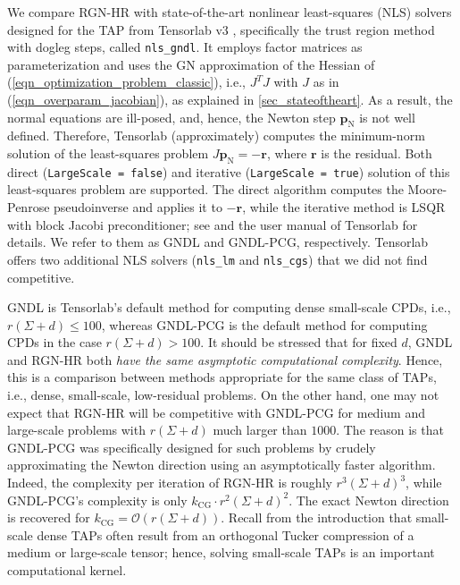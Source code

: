 \documentclass[a4paper,10pt,final]{siamart1116}
\newcommand{\vect}[1]{\mathbf{#1}}
\newcommand{\refeqn}[1]{{(\ref{#1})}}
\newcommand{\refsec}[1]{{\cref{#1}}}
\numberwithin{equation}{section}
\numberwithin{figure}{section}
\numberwithin{table}{section}
\numberwithin{theorem}{section}
\begin{document}
We compare RGN-HR with state-of-the-art nonlinear least-squares (NLS) solvers designed for the TAP from Tensorlab v3 \cite{Tensorlab}, specifically the trust region method with dogleg steps, called \verb|nls_gndl|. It employs factor matrices as parameterization and uses the GN approximation of the Hessian of \refeqn{eqn_optimization_problem_classic}, i.e., $J^T J$ with $J$ as in \refeqn{eqn_overparam_jacobian}, as explained in \refsec{sec_stateoftheart}. As a result, the normal equations are ill-posed, and, hence, the Newton step $\vect{p}_{\text{N}}$ is not well defined. Therefore, Tensorlab (approximately) computes the minimum-norm solution of the least-squares problem $J \vect{p}_{\text{N}} = -\vect{r}$, where $\vect{r}$ is the residual. Both {direct} (\verb|LargeScale = false|) and {iterative} (\verb|LargeScale = true|) solution of this least-squares problem are supported. The direct algorithm computes the Moore-Penrose pseudoinverse and applies it to $-\vect{r}$, while the iterative method is LSQR with block Jacobi preconditioner; see \cite{Sorber2013a} and the user manual of Tensorlab \cite{Tensorlab} for details. We refer to them as GNDL and GNDL-PCG, respectively.
Tensorlab offers two additional NLS solvers (\texttt{nls\_lm} and \texttt{nls\_cgs}) that we did not find competitive.


GNDL is Tensorlab's default method for computing dense small-scale CPDs, i.e., $r(\Sigma+d) \le 100$, whereas GNDL-PCG is the default method for computing CPDs in the case $r(\Sigma+d) > 100$. It should be stressed that for fixed $d$, GNDL and RGN-HR both \emph{have the same asymptotic computational complexity}. Hence, this is a comparison between methods appropriate for the same class of TAPs, i.e., dense, small-scale, low-residual problems. On the other hand, one may not expect that RGN-HR will be competitive with GNDL-PCG for medium and large-scale problems with $r(\Sigma+d)$ much larger than $1000$. The reason is that GNDL-PCG was specifically designed for such problems by crudely approximating the Newton direction using an asymptotically faster algorithm. Indeed, the complexity per iteration of RGN-HR is roughly $r^3 (\Sigma+d)^3$, while GNDL-PCG's complexity is only $k_{\text{CG}} \cdot r^2 (\Sigma+d)^2$. The exact Newton direction is recovered for $k_{\text{CG}} = \mathcal{O}( r(\Sigma+d) )$. Recall from the introduction that small-scale dense TAPs often result from an orthogonal Tucker compression of a medium or large-scale tensor; hence, solving small-scale TAPs is an important computational kernel.
\end{document}

